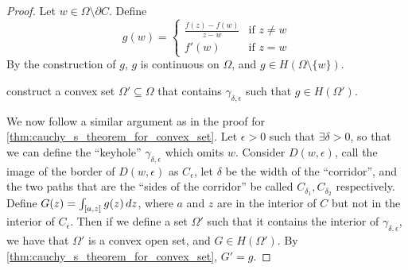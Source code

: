 \documentclass[notoc,notitlepage]{tufte-book}
\begin{document}
\begin{proof}
	Let $w \in \Omega \setminus \partial C$. Define
	\begin{equation*}
		g(w) = \begin{cases}
			\frac{f(z) - f(w)}{z - w} & \text{if } z \neq w \\
			f'(w) 	& \text{if } z = w
		\end{cases}
	\end{equation*}
	By the construction of $g$, $g$ is continuous on $\Omega$, and $g \in H(\Omega \setminus \{w\})$.

	 construct a convex set $\Omega' \subseteq \Omega$ that contains $\gamma_{\delta, \epsilon}$ such that $g \in H(\Omega')$.

  \begin{marginfigure}
  \end{marginfigure}

	We now follow a similar argument as in the proof for \cref{thm:cauchy_s_theorem_for_convex_set}. Let $\epsilon > 0$ such that $\exists \delta > 0$,  so that we can define the ``keyhole'' $\gamma_{\delta, \epsilon}$ which omits $w$. Consider $D(w, \epsilon)$, call the image of the border of $D(w, \epsilon)$ as $C_\epsilon$, let $\delta$ be the width of the ``corridor'', and the two paths that are the ``sides of the corridor'' be called $C_{\delta_1}, C_{\delta_2}$ respectively. Define $G(z) = \int_{[a, z]} g(z) \mathop{}\!d{z}$, where $a$ and $z$ are in the interior of $C$ but not in the interior of $C_\epsilon$. Then if we define a set $\Omega'$ such that it contains the interior of $\gamma_{\delta, \epsilon}$, we have that $\Omega'$ is a convex open set, and $G \in H(\Omega')$. By \cref{thm:cauchy_s_theorem_for_convex_set}, $G' = g$.


\end{proof}
\end{document}
